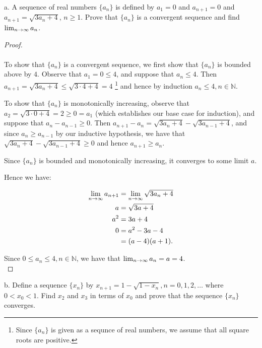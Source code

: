 a.  A sequence of real numbers $\{a_n\}$ is defined by $a_1 = 0$ and
    $a_{n+1} = 0$ and $a_{n+1} = \sqrt{3a_n + 4}$, $n \ge 1$. Prove that
    $\{a_n\}$ is a convergent sequence and find
    ${\lim_{n \rightarrow \infty}{a_n}}$.

    \begin{proof}\ \\\\

        To show that $\{a_n\}$ is a convergent sequence, we first show that
        $\{a_n\}$ is bounded above by $4$. Observe that
        $a_1 = 0 \le 4$, and suppose that $a_n \le 4$. Then
        $a_{n+1} = \sqrt{3a_n + 4} \le \sqrt{3 \cdot 4 + 4} = 4$
        {\footnote{Since $\{a_n\}$ is given as a sequnce of real numbers,
                   we assume that all square roots are positive.}} and hence by
        induction $a_{n} \le 4, n \in \mathbb{N}$.

        To show that $\{a_n\}$ is monotonically increasing, observe that
        $a_2 = \sqrt{3 \cdot 0 + 4} = 2 \ge 0 = a_1$ (which establishes our 
        base case for induction), and suppose that
        $a_n - a_{n-1} \ge 0$. Then 
        $a_{n+1} - a_n = \sqrt{3a_n + 4} - \sqrt {3a_{n-1} + 4}$, and since
        $a_n \ge a_{n-1}$ by our inductive hypothesis, we have that 
        $\sqrt{3a_n + 4} - \sqrt {3a_{n-1} + 4} \ge 0$ and hence
        $a_{n+1} \ge a_n$.

        Since $\{a_n\}$ is bounded and monotonically increasing, it converges to
        some limit $a$.

        Hence we have:

        \begin{align*}
            {\lim_{n \rightarrow \infty}{a_{n+1}}} &= {\lim_{n \rightarrow \infty}{\sqrt{3a_n + 4}}} \\
                                               a &= \sqrt{3a + 4} \\
                                             a^2 &= 3a + 4 \\
                                               0 &= a^2 - 3a - 4 \\
                                                 &= (a - 4)(a + 1).
        \end{align*}

        Since $0 \le a_n \le 4, n \in \mathbb{N}$, we have that 
        ${\lim_{n \rightarrow \infty}{a_n}} = a = 4$.
        \\
    \end{proof}
    \pagebreak

b.  Define a sequence 
    $\{x_n\}$ by $x_{n+1} = 1 - \sqrt{1 - x_n}, n = 0, 1, 2, \ldots$ where
    $0 < x_0 < 1$. Find $x_2$ and $x_3$ in terms of $x_0$ and prove that the
    sequence $\{x_n\}$ converges.

